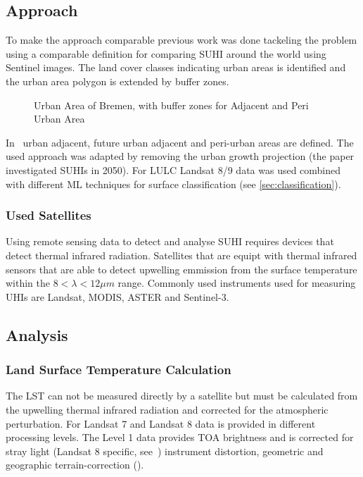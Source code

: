 \documentclass[a4paper, english]{article}
\begin{document}
    \subsection{Approach}
    To make the approach comparable previous work was done tackeling the problem using a comparable definition for comparing \gls{SUHI} around the world using Sentinel images\cite{Sobrino2020}.
    The land cover classes indicating urban areas is identified and the urban area polygon is extended by buffer zones. 
    \begin{figure}
      
      \caption{Urban Area of Bremen, with buffer zones for Adjacent and Peri Urban Area}
    \end{figure}
    In~\cite{Sobrino2020} urban adjacent, future urban adjacent and peri-urban areas are defined.
    The used approach was adapted by removing the urban growth projection (the paper investigated \glspl{SUHI} in 2050).
    For \gls{LULC} Landsat 8/9 data was used combined with different \gls{ML} techniques for surface classification (see \cref{sec:classification}). %

    
    \subsubsection{Used Satellites}
    Using remote sensing data to detect and analyse \gls{SUHI} requires devices that detect thermal infrared radiation. 
    Satellites that are equipt with thermal infrared sensors that are able to detect upwelling emmission from the surface temperature within the $ 8 < \lambda < 12 \mu m $ range. 
    Commonly used instruments used for measuring \glspl{UHI} are Landsat, MODIS, ASTER and Sentinel-3. 
    
    \subsection{Analysis}
    \subsubsection{Land Surface Temperature Calculation}\label{sec:lstcalc}
    The \gls{LST} can not be measured directly by a satellite but must be calculated from the upwelling thermal infrared radiation and corrected for the atmospheric perturbation. For Landsat 7 and Landsat 8 data is provided in different processing levels.
    The Level 1 data provides \gls{TOA} brightness and is corrected for stray light (Landsat 8 specific, see~\cite[p.~67]{Zanter2019}) instrument distortion, geometric and geographic terrain-correction (\cite[p.~44]{Zanter2019}).
\end{document}
